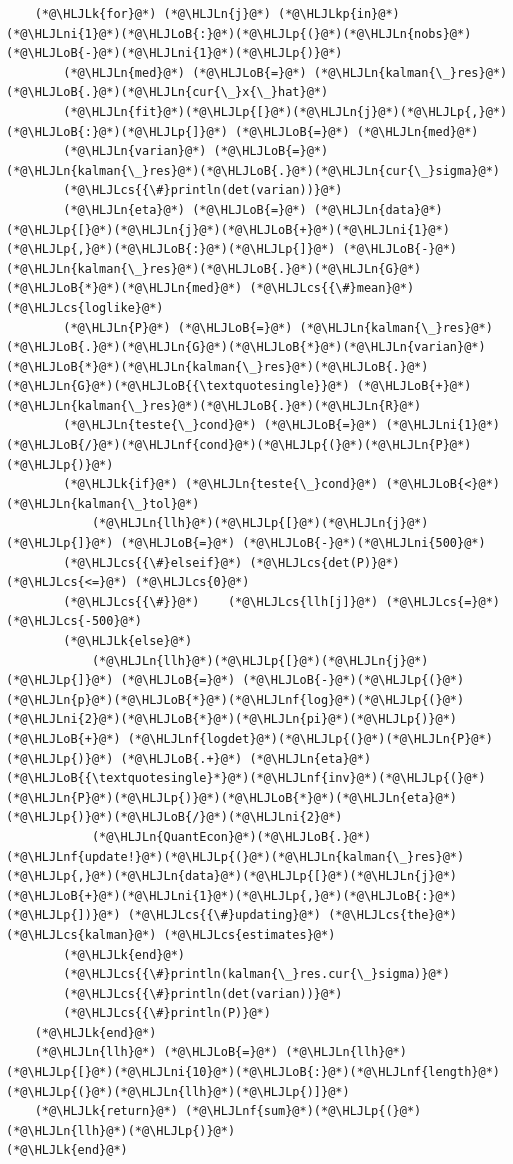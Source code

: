 \documentclass[12pt,a4paper]{article}
\newcommand{\HLJLk}[1]{\textcolor[RGB]{148,91,176}{\textbf{#1}}}
\newcommand{\HLJLkp}[1]{\textcolor[RGB]{148,91,176}{\textbf{#1}}}
\newcommand{\HLJLn}[1]{#1}
\newcommand{\HLJLnf}[1]{\textcolor[RGB]{66,102,213}{#1}}
\newcommand{\HLJLni}[1]{\textcolor[RGB]{59,151,46}{#1}}
\newcommand{\HLJLoB}[1]{\textcolor[RGB]{102,102,102}{\textbf{#1}}}
\newcommand{\HLJLp}[1]{#1}
\newcommand{\HLJLcs}[1]{\textcolor[RGB]{153,153,119}{\textit{#1}}}
\begin{document}
\begin{lstlisting}
    (*@\HLJLk{for}@*) (*@\HLJLn{j}@*) (*@\HLJLkp{in}@*) (*@\HLJLni{1}@*)(*@\HLJLoB{:}@*)(*@\HLJLp{(}@*)(*@\HLJLn{nobs}@*)(*@\HLJLoB{-}@*)(*@\HLJLni{1}@*)(*@\HLJLp{)}@*)
        (*@\HLJLn{med}@*) (*@\HLJLoB{=}@*) (*@\HLJLn{kalman{\_}res}@*)(*@\HLJLoB{.}@*)(*@\HLJLn{cur{\_}x{\_}hat}@*)
        (*@\HLJLn{fit}@*)(*@\HLJLp{[}@*)(*@\HLJLn{j}@*)(*@\HLJLp{,}@*)(*@\HLJLoB{:}@*)(*@\HLJLp{]}@*) (*@\HLJLoB{=}@*) (*@\HLJLn{med}@*)
        (*@\HLJLn{varian}@*) (*@\HLJLoB{=}@*) (*@\HLJLn{kalman{\_}res}@*)(*@\HLJLoB{.}@*)(*@\HLJLn{cur{\_}sigma}@*)
        (*@\HLJLcs{{\#}println(det(varian))}@*)
        (*@\HLJLn{eta}@*) (*@\HLJLoB{=}@*) (*@\HLJLn{data}@*)(*@\HLJLp{[}@*)(*@\HLJLn{j}@*)(*@\HLJLoB{+}@*)(*@\HLJLni{1}@*)(*@\HLJLp{,}@*)(*@\HLJLoB{:}@*)(*@\HLJLp{]}@*) (*@\HLJLoB{-}@*) (*@\HLJLn{kalman{\_}res}@*)(*@\HLJLoB{.}@*)(*@\HLJLn{G}@*)(*@\HLJLoB{*}@*)(*@\HLJLn{med}@*) (*@\HLJLcs{{\#}mean}@*) (*@\HLJLcs{loglike}@*)
        (*@\HLJLn{P}@*) (*@\HLJLoB{=}@*) (*@\HLJLn{kalman{\_}res}@*)(*@\HLJLoB{.}@*)(*@\HLJLn{G}@*)(*@\HLJLoB{*}@*)(*@\HLJLn{varian}@*)(*@\HLJLoB{*}@*)(*@\HLJLn{kalman{\_}res}@*)(*@\HLJLoB{.}@*)(*@\HLJLn{G}@*)(*@\HLJLoB{{\textquotesingle}}@*) (*@\HLJLoB{+}@*) (*@\HLJLn{kalman{\_}res}@*)(*@\HLJLoB{.}@*)(*@\HLJLn{R}@*)
        (*@\HLJLn{teste{\_}cond}@*) (*@\HLJLoB{=}@*) (*@\HLJLni{1}@*)(*@\HLJLoB{/}@*)(*@\HLJLnf{cond}@*)(*@\HLJLp{(}@*)(*@\HLJLn{P}@*)(*@\HLJLp{)}@*)
        (*@\HLJLk{if}@*) (*@\HLJLn{teste{\_}cond}@*) (*@\HLJLoB{<}@*) (*@\HLJLn{kalman{\_}tol}@*)
            (*@\HLJLn{llh}@*)(*@\HLJLp{[}@*)(*@\HLJLn{j}@*)(*@\HLJLp{]}@*) (*@\HLJLoB{=}@*) (*@\HLJLoB{-}@*)(*@\HLJLni{500}@*)
        (*@\HLJLcs{{\#}elseif}@*) (*@\HLJLcs{det(P)}@*) (*@\HLJLcs{<=}@*) (*@\HLJLcs{0}@*)
        (*@\HLJLcs{{\#}}@*)    (*@\HLJLcs{llh[j]}@*) (*@\HLJLcs{=}@*) (*@\HLJLcs{-500}@*)
        (*@\HLJLk{else}@*)
            (*@\HLJLn{llh}@*)(*@\HLJLp{[}@*)(*@\HLJLn{j}@*)(*@\HLJLp{]}@*) (*@\HLJLoB{=}@*) (*@\HLJLoB{-}@*)(*@\HLJLp{(}@*)(*@\HLJLn{p}@*)(*@\HLJLoB{*}@*)(*@\HLJLnf{log}@*)(*@\HLJLp{(}@*)(*@\HLJLni{2}@*)(*@\HLJLoB{*}@*)(*@\HLJLn{pi}@*)(*@\HLJLp{)}@*) (*@\HLJLoB{+}@*) (*@\HLJLnf{logdet}@*)(*@\HLJLp{(}@*)(*@\HLJLn{P}@*)(*@\HLJLp{)}@*) (*@\HLJLoB{.+}@*) (*@\HLJLn{eta}@*)(*@\HLJLoB{{\textquotesingle}*}@*)(*@\HLJLnf{inv}@*)(*@\HLJLp{(}@*)(*@\HLJLn{P}@*)(*@\HLJLp{)}@*)(*@\HLJLoB{*}@*)(*@\HLJLn{eta}@*)(*@\HLJLp{)}@*)(*@\HLJLoB{/}@*)(*@\HLJLni{2}@*)
            (*@\HLJLn{QuantEcon}@*)(*@\HLJLoB{.}@*)(*@\HLJLnf{update!}@*)(*@\HLJLp{(}@*)(*@\HLJLn{kalman{\_}res}@*)(*@\HLJLp{,}@*)(*@\HLJLn{data}@*)(*@\HLJLp{[}@*)(*@\HLJLn{j}@*)(*@\HLJLoB{+}@*)(*@\HLJLni{1}@*)(*@\HLJLp{,}@*)(*@\HLJLoB{:}@*)(*@\HLJLp{])}@*) (*@\HLJLcs{{\#}updating}@*) (*@\HLJLcs{the}@*) (*@\HLJLcs{kalman}@*) (*@\HLJLcs{estimates}@*)
        (*@\HLJLk{end}@*)
        (*@\HLJLcs{{\#}println(kalman{\_}res.cur{\_}sigma)}@*)
        (*@\HLJLcs{{\#}println(det(varian))}@*)
        (*@\HLJLcs{{\#}println(P)}@*)
    (*@\HLJLk{end}@*)
    (*@\HLJLn{llh}@*) (*@\HLJLoB{=}@*) (*@\HLJLn{llh}@*)(*@\HLJLp{[}@*)(*@\HLJLni{10}@*)(*@\HLJLoB{:}@*)(*@\HLJLnf{length}@*)(*@\HLJLp{(}@*)(*@\HLJLn{llh}@*)(*@\HLJLp{)]}@*)
    (*@\HLJLk{return}@*) (*@\HLJLnf{sum}@*)(*@\HLJLp{(}@*)(*@\HLJLn{llh}@*)(*@\HLJLp{)}@*)
(*@\HLJLk{end}@*)
\end{lstlisting}
\end{document}
